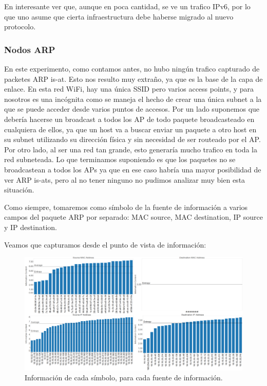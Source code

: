 \documentclass{article}
\theoremstyle{definition}
\theoremstyle{remark}
\begin{document}
\par En interesante ver que, aunque en poca cantidad, se ve un trafico IPv6, por lo que uno asume que cierta infraestructura debe haberse migrado al nuevo protocolo.

\subsubsection{Nodos ARP}
En este experimento, como contamos antes, no hubo ningún trafico capturado de packetes ARP is-at. Esto nos resulto muy extraño, ya que es la base de la capa de enlace. En esta red WiFi, hay una única SSID pero varios access points, y para nosotros es una incógnita como se maneja el hecho de crear una única subnet a la que se puede acceder desde varios puntos de accesos. Por un lado suponemos que debería hacerse un broadcast a todos los AP de todo paquete broadcasteado en cualquiera de ellos, ya que un host va a buscar enviar un paquete a otro host en su subnet utilizando su dirección física y sin necesidad de ser routeado por el AP. Por otro lado, al ser una red tan grande, esto generaría mucho trafico en toda la red subneteada. Lo que terminamos suponiendo es que los paquetes no se broadcastean a todos los APs ya que en ese caso habría una mayor posibilidad de ver ARP is-ats, pero al no tener ninguno no pudimos analizar muy bien esta situación.

\par Como siempre, tomaremos como símbolo de la fuente de información a varios campos del paquete ARP por separado: MAC source, MAC destination, IP source y IP destination.

\par Veamos que capturamos desde el punto de vista de información:

\begin{figure}[H]
\centering
\includegraphics[width=420pt]{captures/MercadoLibre/PDFs Dashboard.png}
\caption{Información de cada símbolo, para cada fuente de información.}
\end{figure}
\end{document}
